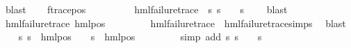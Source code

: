 \begin{isabellebody}
\ blast\isanewline
{}\isamarkupfalse%
\isanewline
\ \ \isamarkupfalse%
\ {\isacharparenleft}{\kern0pt}f{\isacharunderscore}{\kern0pt}trace{\isacharunderscore}{\kern0pt}pos\ {\isasymphi}\ {\isasymalpha}{\isacharparenright}{\kern0pt}\isanewline
\ \ \isamarkupfalse%
\ \isamarkupfalse%
\ {\isasympsi}\ \ {\isachardoublequoteopen}hml{\isacharunderscore}{\kern0pt}failure{\isacharunderscore}{\kern0pt}trace\ {\isasympsi}{\isachardoublequoteclose}\ {\isachardoublequoteopen}{\isacharparenleft}{\kern0pt}{\isasymforall}s{\isachardot}{\kern0pt}\ {\isacharparenleft}{\kern0pt}s\ {\isasymTurnstile}\ {\isasymphi}{\isacharparenright}{\kern0pt}\ {\isacharequal}{\kern0pt}\ {\isacharparenleft}{\kern0pt}s\ {\isasymTurnstile}\ {\isasympsi}{\isacharparenright}{\kern0pt}{\isacharparenright}{\kern0pt}{\isachardoublequoteclose}\ \isamarkupfalse%
\ blast\isanewline
\ \ \isamarkupfalse%
\ {\isachardoublequoteopen}hml{\isacharunderscore}{\kern0pt}failure{\isacharunderscore}{\kern0pt}trace\ {\isacharparenleft}{\kern0pt}hml{\isacharunderscore}{\kern0pt}pos\ {\isasymalpha}\ {\isasympsi}{\isacharparenright}{\kern0pt}{\isachardoublequoteclose}\ \isanewline
\ \ \ \ \isamarkupfalse%
\ {\isacartoucheopen}hml{\isacharunderscore}{\kern0pt}failure{\isacharunderscore}{\kern0pt}trace\ {\isasympsi}{\isacartoucheclose}\ hml{\isacharunderscore}{\kern0pt}failure{\isacharunderscore}{\kern0pt}trace{\isachardot}{\kern0pt}simps\ \isamarkupfalse%
\ blast\isanewline
\ \ \isamarkupfalse%
\ {\isachardoublequoteopen}{\isacharparenleft}{\kern0pt}{\isasymforall}s{\isachardot}{\kern0pt}\ {\isacharparenleft}{\kern0pt}s\ {\isasymTurnstile}\ hml{\isacharunderscore}{\kern0pt}pos\ {\isasymalpha}\ {\isasymphi}{\isacharparenright}{\kern0pt}\ {\isacharequal}{\kern0pt}\ {\isacharparenleft}{\kern0pt}s\ {\isasymTurnstile}\ {\isacharparenleft}{\kern0pt}hml{\isacharunderscore}{\kern0pt}pos\ {\isasymalpha}\ {\isasympsi}{\isacharparenright}{\kern0pt}{\isacharparenright}{\kern0pt}{\isacharparenright}{\kern0pt}{\isachardoublequoteclose}\ \isanewline
\ \ \ \ \isamarkupfalse%
\ {\isacharparenleft}{\kern0pt}simp\ add{\isacharcolon}{\kern0pt}\ {\isacartoucheopen}{\isasymforall}s{\isachardot}{\kern0pt}\ {\isacharparenleft}{\kern0pt}s\ {\isasymTurnstile}\ {\isasymphi}{\isacharparenright}{\kern0pt}\ {\isacharequal}{\kern0pt}\ {\isacharparenleft}{\kern0pt}s\ {\isasymTurnstile}\ {\isasympsi}{\isacharparenright}{\kern0pt}{\isacartoucheclose}{\isacharparenright}{\kern0pt}\isanewline

\end{isabellebody}
